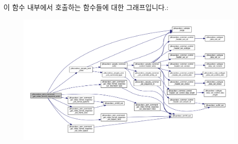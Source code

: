 이 함수 내부에서 호출하는 함수들에 대한 그래프입니다.\+:
\nopagebreak
\begin{figure}[H]
\begin{center}
\leavevmode
\includegraphics[width=350pt]{group__command__get__video__format__response_gaf6d53e5e32e09493485f38b58259e979_cgraph}
\end{center}
\end{figure}


